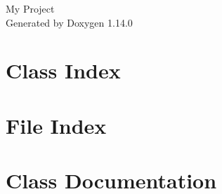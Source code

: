 \documentclass[twoside]{book}
\newcommand{\+}{\discretionary{\mbox{\scriptsize$\hookleftarrow$}}{}{}}
\newcommand{\clearemptydoublepage}{%
    \newpage{\pagestyle{empty}\cleardoublepage}%
  }
\begin{document}
  \raggedbottom
    \hypersetup{pageanchor=false,
                bookmarksnumbered=true,
                pdfencoding=unicode
               }
  \begin{titlepage}
  \vspace*{7cm}
  \begin{center}%
  {\Large My Project}\\
  \vspace*{1cm}
  {\large Generated by Doxygen 1.14.0}\\
  \end{center}
  \end{titlepage}
  \clearemptydoublepage
  \tableofcontents
  \clearemptydoublepage
  \hypersetup{pageanchor=true}
\chapter{Class Index}

\chapter{File Index}

\chapter{Class Documentation}
















\end{document}
